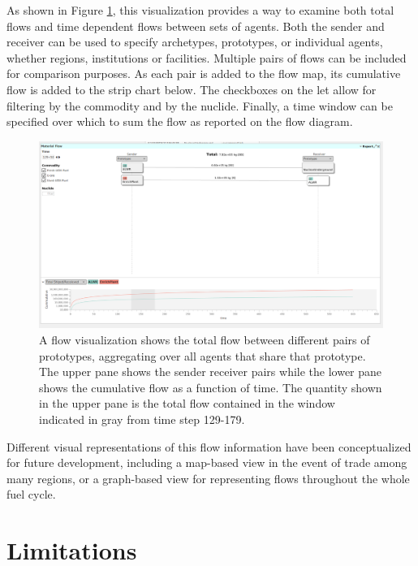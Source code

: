 As shown in Figure \ref{fig:flow-01-05}, this visualization provides a way to
examine both total flows and time dependent flows between sets of agents.
Both the sender and receiver can be used to specify archetypes, prototypes, or
individual agents, whether regions, institutions or facilities.  Multiple
pairs of flows can be included for comparison purposes.  As each pair is added
to the flow map, its cumulative flow is added to the strip chart below.  The
checkboxes on the let allow for filtering by the commodity and by the nuclide.
Finally, a time window can be specified over which to sum the flow as reported
on the flow diagram.

\begin{figure}[htbp]
  \centering
  \includegraphics[width=\columnwidth]{./images/flow-01-05}
  \caption[Flow visualization from Cyclist between pairs of prototypes.]{A
    flow visualization shows the total flow between different pairs of
    prototypes, aggregating over all agents that share that prototype.  The
    upper pane shows the sender receiver pairs while the lower pane shows the
    cumulative flow as a function of time.  The quantity shown in the upper
    pane is the total flow contained in the window indicated in gray from time
    step 129-179. }
  \label{fig:flow-01-05}
\end{figure}

Different visual representations of this flow information have been
conceptualized for future development, including a map-based view in the event
of trade among many regions, or a graph-based view for representing flows
throughout the whole fuel cycle.

\section{Limitations}

